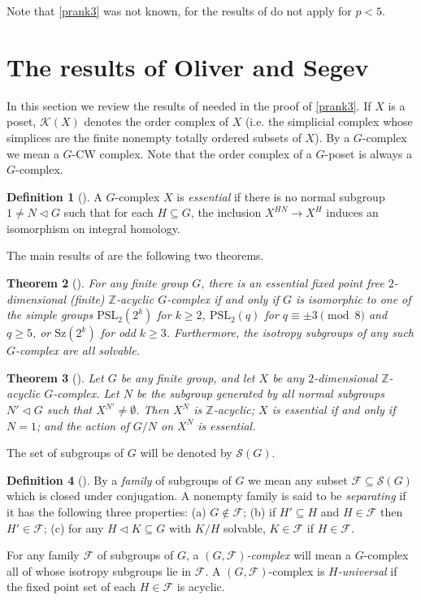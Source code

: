 \documentclass[11pt,twoside,reqno]{amsart}
\theoremstyle{plain}
\newtheorem{theorem}{Theorem}[section]
\theoremstyle{definition}
\newtheorem{definition}[theorem]{Definition}
\theoremstyle{remark}
\def\F{\mathcal{F}}
\def\K{\mathcal{K}}
\def\S{\mathcal{S}}
\def\Z{\mathbb{Z}}
\def\PSL{\mathrm{PSL}}
\def\Sz{\mathrm{Sz}}
\begin{document}
Note that  \cref{prank3} was not known, for the results of \cite{AschbacherSmith} do not apply for $p<5$.

\section{The results of Oliver and Segev}

In this section we review the results of \cite{OS} needed in the proof of \cref{prank3}.
If $X$ is a poset, $\K(X)$ denotes the order complex of $X$ (i.e. the simplicial complex whose simplices are the finite nonempty totally ordered subsets of $X$).
By a $G$-complex we mean a $G$-CW complex. Note that the order complex of a $G$-poset is always a $G$-complex.

\begin{definition}[{\cite{OS}}]
 A $G$-complex $X$ is \textit{essential} if there is no normal subgroup $1\neq N\triangleleft G$ such that for each $H\subseteq G$, the inclusion $X^{HN}\to X^H$ induces an isomorphism on integral homology.
\end{definition}

The main results of \cite{OS} are the following two theorems.

\begin{theorem}[{\cite[Theorem A]{OS}}]\label{teoA}
 For any finite group $G$, there is an essential fixed point free $2$-dimensional (finite) $\Z$-acyclic $G$-complex if and only if $G$ is isomorphic to one of the simple groups $\PSL_2(2^k)$ for $k\geq 2$, $\PSL_2(q)$ for $q\equiv \pm 3 \pmod 8$ and $q\geq 5$, or $\Sz(2^k)$ for odd $k\geq 3$. Furthermore, the isotropy subgroups of any such $G$-complex are all solvable.
\end{theorem}

\begin{theorem}[{\cite[Theorem B]{OS}}]\label{teoB}
 Let $G$ be any finite group, and let $X$ be any $2$-dimensional $\Z$-acyclic $G$-complex. Let $N$ be the subgroup generated by all normal subgroups $N'\triangleleft G$ such that $X^{N'}\neq \emptyset$. Then $X^N$ is $\Z$-acyclic; $X$ is essential if and only if $N=1$; and the action of $G/N$ on $X^N$ is essential.
\end{theorem}

The set of subgroups of $G$ will be denoted by $\S(G)$.

\begin{definition}[{\cite{OS}}]
 By a \textit{family} of subgroups of $G$ we mean any subset $\F\subseteq\S(G)$ which is closed under conjugation.
 A nonempty family is said to be \textit{separating} if it has the following three properties: (a) $G\notin \F$; (b) if $H'\subseteq H$ and $H\in \F$ then $H'\in \F$; (c) for any $H\triangleleft K\subseteq G$ with $K/H$ solvable, $K\in \F$ if $H\in \F$.

 For any family $\F$ of subgroups of $G$, a \textit{$(G,\F)$-complex} will mean a $G$-complex all of whose isotropy subgroups lie in $\F$. A $(G,\F)$-complex is \textit{$H$-universal} if the fixed point set of each $H\in \F$ is acyclic.
\end{definition}
\end{document}
